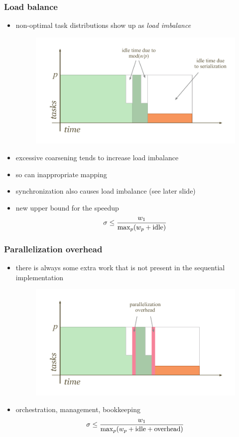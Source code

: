 \begin{frame}[fragile]
%
  \frametitle{Load balance}
%
  \begin{itemize}
%
  \item non-optimal task distributions show up as {\em load imbalance}
    \begin{figure}
      \centering
      \includegraphics[scale=1.0]{figures/reduction-load-imbalance.pdf}
    \end{figure}
%
  \item excessive coarsening tends to increase load imbalance
  \item so can inappropriate mapping
  \item synchronization also causes load imbalance (see later slide)
  \item new upper bound for the speedup
    \[
    \sigma \leq \frac{w_{1}}{{\rm max}_{p}(w_{p} + {\rm idle})}
    \]
      
  \end{itemize}
%
\end{frame}

\begin{frame}[fragile]
%
  \frametitle{Parallelization overhead}
%
  \begin{itemize}
%
  \item there is always some extra work that is not present in the sequential implementation
    \begin{figure}
      \centering
      \includegraphics[scale=1.0]{figures/reduction-overhead.pdf}
    \end{figure}
%
  \item orchestration, management, bookkeeping
    \[
    \sigma \leq \frac{w_{1}}{{\rm max}_{p}(w_{p} + {\rm idle} + {\rm overhead})}
    \]
      
%
  \end{itemize}
%
\end{frame}

